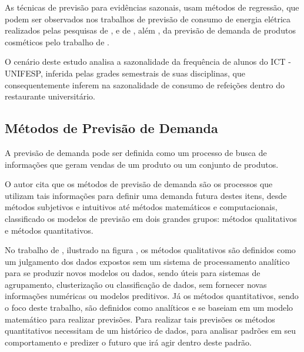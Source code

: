 As técnicas de previsão para evidências sazonais, usam métodos de regressão, que podem ser observados nos trabalhos de previsão de consumo de energia elétrica realizados pelas pesquisas de ,  e de , além , da previsão de demanda de produtos cosméticos pelo trabalho de .

O cenário deste estudo analisa a sazonalidade da frequência de alunos do ICT - UNIFESP, inferida pelas grades semestrais de suas disciplinas, que consequentemente inferem na sazonalidade de consumo de refeições dentro do restaurante universitário.\newline

\subsection{Métodos de Previsão de Demanda} 

A previsão de demanda pode ser definida como um processo de busca de informações que geram vendas de um produto ou um conjunto de produtos.

O autor  cita que os métodos de previsão de demanda são os processos que utilizam tais informações para definir uma demanda futura destes itens, desde métodos subjetivos e intuitivos até métodos matemáticos e computacionais, classificado os modelos de previsão em dois grandes grupos: métodos qualitativos e métodos quantitativos.

No trabalho de , ilustrado na figura \label{fig:metodosPrevisaoDemanda}, os métodos qualitativos são definidos como um julgamento dos dados expostos sem um sistema de processamento analítico para se produzir novos modelos ou dados, sendo úteis para sistemas de agrupamento, clusterização ou classificação de dados, sem fornecer novas informações numéricas ou modelos preditivos. Já os métodos quantitativos, sendo o foco deste trabalho, são definidos como analíticos e se baseiam em um modelo matemático para realizar previsões. Para realizar tais previsões os métodos quantitativos necessitam de um histórico de dados, para analisar padrões em seu comportamento e predizer o futuro que irá agir dentro deste padrão.

